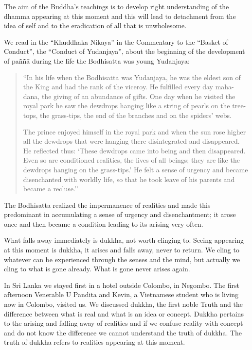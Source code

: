 The aim of the Buddha’s teachings is to develop right understanding of the dhamma 
appearing at this moment and this will lead to detachment from the idea of self and to 
the eradication of all that is unwholesome. 

We read in the ``Khuddhaka Nikaya'' in the Commentary to the ``Basket of Conduct'', 
the ``Conduct of Yudanjaya'', about the beginning of the development of paññā during the life the Bodhisatta was young Yudanjaya: 

\begin{quotation}
``In his life when the Bodhisatta was Yudanjaya, he was the eldest son 
of the King and had the rank of the viceroy. He fulfilled every day 
maha-dana, the giving of an abundance of gifts. One day when he visited the royal park he saw the dewdrops hanging like a string of pearls 
on the tree-tops, the grass-tips, the end of the branches and on the spiders’ webs. 

The prince enjoyed himself in the royal park and when the sun rose 
higher all the dewdrops that were hanging there disintegrated and disappeared. He reflected thus: `These dewdrops came into being and 
then disappeared. Even so are conditioned realities, the lives of all beings; they are like the dewdrops hanging on the grass-tips.’ He felt a 
sense of urgency and became disenchanted with worldly life, so that 
he took leave of his parents and became a recluse.''
\end{quotation}

The Bodhisatta realized the impermanence of realities and made this predominant in 
accumulating a sense of urgency and disenchantment; it arose once and then became 
a condition leading to its arising very often. 

What falls away immediately is dukkha, not worth clinging to. Seeing appearing at 
this moment is dukkha, it arises and falls away, never to return. We cling to whatever 
can be experienced through the senses and the mind, but actually we cling to what is 
gone already. What is gone never arises again. 

In Sri Lanka we stayed first in a hotel outside Colombo, in Negombo. The first afternoon Venerable U Pandita and Kevin, a Vietnamese student who is living now in Colombo, visited us. We discussed dukkha, the first noble Truth and the difference between what is real and what is an idea or concept. Dukkha pertains to the arising and 
falling away of realities and if we confuse reality with concept and do not know the 
difference we cannot understand the truth of dukkha. The truth of dukkha refers to realities appearing at this moment. 

